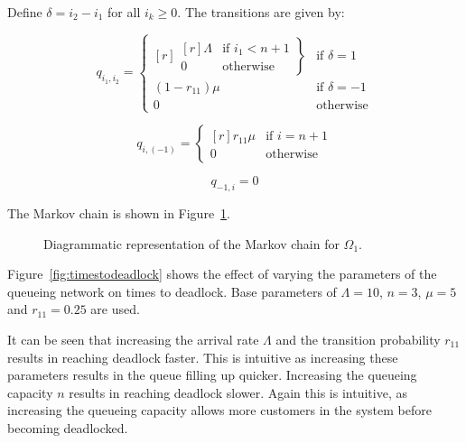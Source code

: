 \documentclass{article}
\numberwithin{equation}{section}
\begin{document}
Define $\delta = i_2 - i_1$ for all $i_k \geq 0$. The transitions are given by:

\begin{equation}
  q_{i_1, i_2} = \left\{
  \begin{matrix*}[ r ]
    \left. \begin{matrix*}[ r ]
      \Lambda & \text{if } i_1 < n + 1 \\
      0 & \text{otherwise}
    \end{matrix*} \right\} & \text{if } \delta = 1 \\
    (1 - r_{11})\mu & \text{if } \delta = -1 \\
    0 & \text{otherwise}
  \end{matrix*} \right.
\end{equation}

\begin{equation}
  q_{i, (-1)} = \left\{
  \begin{matrix*}[ r ]
    r_{11}\mu & \text{if } i = n + 1 \\
    0 & \text{otherwise}
  \end{matrix*}
  \right.
\end{equation}

\begin{equation}
  q_{-1, i} = 0
\end{equation}

The Markov chain is shown in Figure~\ref{fig:1nodeMC}.

\begin{figure}[!htbp]
  \begin{center}
    
  \end{center}
  \caption{Diagrammatic representation of the Markov chain for $\Omega_1$.}
  \label{fig:1nodeMC}
\end{figure}

Figure~\ref{fig:timestodeadlock} shows the effect of varying the parameters of the queueing network on times to deadlock.
Base parameters of $\Lambda = 10$, $n = 3$, $\mu = 5$ and $r_{11} = 0.25$ are used.

It can be seen that increasing the arrival rate $\Lambda$ and the transition probability $r_{11}$ results in reaching deadlock faster.
This is intuitive as increasing these parameters results in the queue filling up quicker.
Increasing the queueing capacity $n$ results in reaching deadlock slower.
Again this is intuitive, as increasing the queueing capacity allows more customers in the system before becoming deadlocked.
\end{document}
